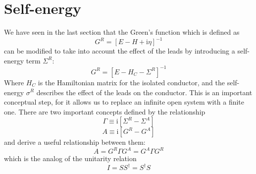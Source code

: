 \documentclass[11pt,a4paper]{book}
\theoremstyle{plain}
\theoremstyle{definition}
\theoremstyle{remark}
\newcommand{\ii}{\mathrm{i}}                      %
\begin{document}
\section{Self-energy}
We have seen in the last section that the Green's function which is defined as
\begin{equation}
    G^R = \left[E -H + \ii \eta \right]^{-1}
\end{equation}
can be modified to take into account the effect of the leads by introducing a self-energy term $\Sigma^R$:
\begin{equation}
    G^R = \left[E - H_C - \Sigma^R \right]^{-1}
\end{equation}
Where $H_C$ is the Hamiltonian matrix for the isolated conductor, and the self-energy $\sigma^R$ describes the effect of the leads on the conductor. This is an important conceptual step, for it allows us to replace an infinite open system with a finite one. There are two important concepts defined by the relationship
\begin{equation}
    \Gamma \equiv \ii \left[\Sigma^R - \Sigma^A \right]
\end{equation}
\begin{equation}
    A \equiv \ii \left[G^R - G^A \right]
\end{equation}
and derive a useful relationship between them:
\begin{equation}
    A = G^R \Gamma G^A = G^A \Gamma G^R
\end{equation}
which is the analog of the unitarity relation
\begin{equation}
    I = S S^\dagger = S^\dagger S
\end{equation}
\end{document}
